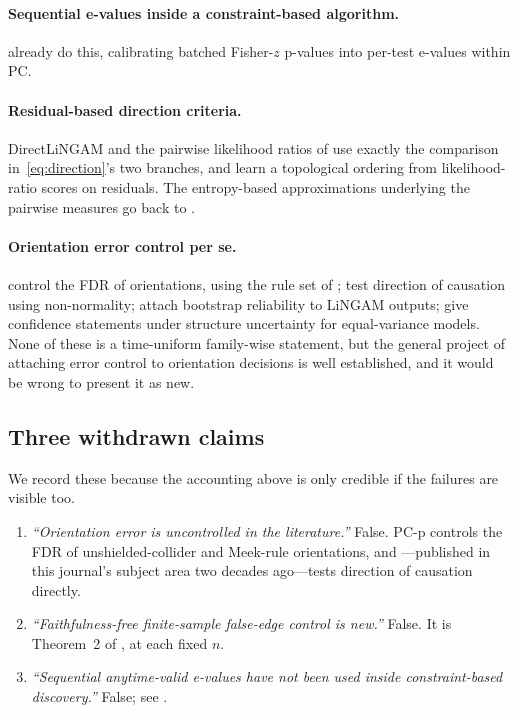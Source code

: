 \documentclass[pdflatex,sn-apa]{sn-jnl}
\theoremstyle{thmstyleone}%
\theoremstyle{thmstyletwo}%
\theoremstyle{thmstylethree}%
\begin{document}
\paragraph{Sequential e-values inside a constraint-based algorithm.}
\citet{csillag2025prediction} already do this, calibrating batched Fisher-$z$
p-values into per-test e-values within PC.

\paragraph{Residual-based direction criteria.} DirectLiNGAM
\citep{shimizu2011directlingam} and the pairwise likelihood ratios of
\citet{hyvarinen2013pairwise} use exactly the comparison
in~\eqref{eq:direction}'s two branches, and \citet{ruiz2022sequentially} learn
a topological ordering from likelihood-ratio scores on residuals. The
entropy-based approximations underlying the pairwise measures go back to
\citet{hyvarinen1998new}.

\paragraph{Orientation error control per se.} \citet{strobl2019estimating}
control the FDR of orientations, using the rule set of
\citet{meek1995causal}; \citet{shimizu2008use} test direction of
causation using non-normality; \citet{komatsu2010assessing} attach bootstrap
reliability to LiNGAM outputs; \citet{strieder2023confidence} give confidence
statements under structure uncertainty for equal-variance models. None of
these is a time-uniform family-wise statement, but the general project of
attaching error control to orientation decisions is well established, and it
would be wrong to present it as new.

\subsection{Three withdrawn claims}\label{sec:withdrawn}

We record these because the accounting above is only credible if the failures
are visible too.

\begin{enumerate}
\item \emph{``Orientation error is uncontrolled in the literature.''} False.
  PC-p \citep{strobl2019estimating} controls the FDR of unshielded-collider
  and Meek-rule orientations, and \citet{shimizu2008use}---published in this
  journal's subject area two decades ago---tests direction of causation
  directly.
\item \emph{``Faithfulness-free finite-sample false-edge control is new.''}
  False. It is Theorem~2 of \citet{shaska2025causal}, at each fixed $n$.
\item \emph{``Sequential anytime-valid e-values have not been used inside
  constraint-based discovery.''} False;
  see \citet{csillag2025prediction}.
\end{enumerate}
\end{document}
